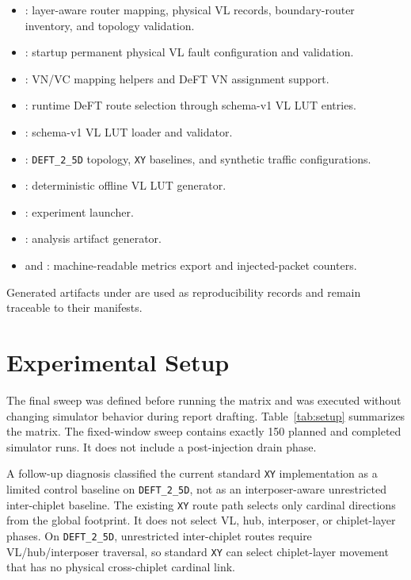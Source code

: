 \documentclass[conference]{IEEEtran}
\begin{document}
\begin{itemize}
    \item {}: layer-aware router mapping, physical VL records, boundary-router inventory, and topology validation.
    \item {}: startup permanent physical VL fault configuration and validation.
    \item {}: VN/VC mapping helpers and DeFT VN assignment support.
    \item {}: runtime DeFT route selection through schema-v1 VL LUT entries.
    \item {}: schema-v1 VL LUT loader and validator.
    \item {}: \texttt{DEFT\_2\_5D} topology, \texttt{XY} baselines, and synthetic traffic configurations.
    \item {}: deterministic offline VL LUT generator.
    \item {}: experiment launcher.
    \item {}: analysis artifact generator.
    \item {} and : machine-readable metrics export and injected-packet counters.
\end{itemize}

Generated artifacts under  are used as reproducibility records and remain traceable to their manifests.

\section{Experimental Setup}

The final sweep was defined before running the matrix and was executed without changing simulator behavior during report drafting. Table~\ref{tab:setup} summarizes the matrix. The fixed-window sweep contains exactly 150 planned and completed simulator runs. It does not include a post-injection drain phase.

A follow-up diagnosis classified the current standard \texttt{XY} implementation as a limited control baseline on \texttt{DEFT\_2\_5D}, not as an interposer-aware unrestricted inter-chiplet baseline. The existing \texttt{XY} route path selects only cardinal directions from the global footprint. It does not select VL, hub, interposer, or chiplet-layer phases. On \texttt{DEFT\_2\_5D}, unrestricted inter-chiplet routes require VL/hub/interposer traversal, so standard \texttt{XY} can select chiplet-layer movement that has no physical cross-chiplet cardinal link.
\end{document}
